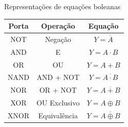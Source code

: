 
\begin{frame}{Representações de equações boleanas}
    \begin{table}[h]
        \centering
        \renewcommand{\arraystretch}{1.4}
        \begin{tabular}{|c|c|c|}
            \hline
            \textbf{Porta} & \textbf{Operação} & \textbf{Equação} \\
            \hline
            NOT  & Negação       & $Y = \overline{A}$ \\
            \hline
            AND  & E             & $Y = A \cdot B$ \\
            \hline
            OR   & OU            & $Y = A + B$ \\
            \hline
            NAND & AND + NOT     & $Y = \overline{A \cdot B}$ \\
            \hline
            NOR  & OR + NOT      & $Y = \overline{A + B}$ \\
            \hline
            XOR  & OU Exclusivo  & $Y = A \oplus B$ \\
            \hline
            XNOR & Equivalência  & $Y = \overline{A \oplus B}$ \\
            \hline
        \end{tabular}
    \end{table}
    
\end{frame}